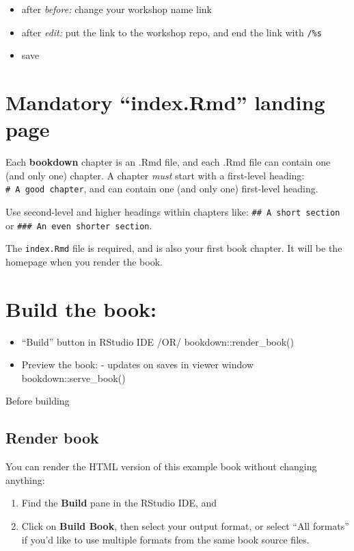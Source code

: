 \documentclass[
]{book}
\providecommand{\tightlist}{%
  \setlength{\itemsep}{0pt}\setlength{\parskip}{0pt}}
\theoremstyle{definition}
\theoremstyle{definition}
\theoremstyle{definition}
\theoremstyle{definition}
\theoremstyle{remark}
\begin{document}
\begin{itemize}
\tightlist
\item
  after \emph{before:} change your workshop name link
\item
  after \emph{edit:} put the link to the workshop repo, and end the link with \texttt{/\%s}
\item
  save
\end{itemize}

\section{Mandatory ``index.Rmd'' landing page}\label{mandatory-index.rmd-landing-page}

Each \textbf{bookdown} chapter is an .Rmd file, and each .Rmd file can contain one (and only one) chapter. A chapter \emph{must} start with a first-level heading: \texttt{\#\ A\ good\ chapter}, and can contain one (and only one) first-level heading.

Use second-level and higher headings within chapters like: \texttt{\#\#\ A\ short\ section} or \texttt{\#\#\#\ An\ even\ shorter\ section}.

The \texttt{index.Rmd} file is required, and is also your first book chapter. It will be the homepage when you render the book.

\section{Build the book:}\label{build-the-book-1}

\begin{itemize}
\tightlist
\item
  ``Build'' button in RStudio IDE /OR/ bookdown::render\_book()
\item
  Preview the book: - updates on saves in viewer window bookdown::serve\_book()
\end{itemize}

Before building

\subsection{Render book}\label{render-book}

You can render the HTML version of this example book without changing anything:

\begin{enumerate}
\def\labelenumi{\arabic{enumi}.}
\item
  Find the \textbf{Build} pane in the RStudio IDE, and
\item
  Click on \textbf{Build Book}, then select your output format, or select ``All formats'' if you'd like to use multiple formats from the same book source files.
\end{enumerate}
\end{document}
